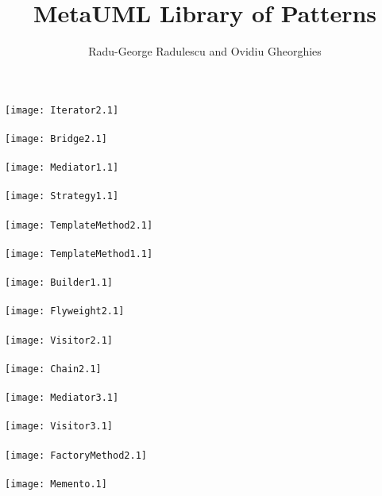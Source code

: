 \documentclass{article}
\title{MetaUML Library of Patterns}
\author{Radu-George Radulescu and Ovidiu Gheorghies}
\begin{document}
 \maketitle
\texttt{[image: Iterator2.1]} \\ \vspace{2cm} \\
\texttt{[image: Bridge2.1]} \\ \vspace{2cm} \\
\texttt{[image: Mediator1.1]} \\ \vspace{2cm} \\
\texttt{[image: Strategy1.1]} \\ \vspace{2cm} \\
\texttt{[image: TemplateMethod2.1]} \\ \vspace{2cm} \\
\texttt{[image: TemplateMethod1.1]} \\ \vspace{2cm} \\
\texttt{[image: Builder1.1]} \\ \vspace{2cm} \\
\texttt{[image: Flyweight2.1]} \\ \vspace{2cm} \\
\texttt{[image: Visitor2.1]} \\ \vspace{2cm} \\
\texttt{[image: Chain2.1]} \\ \vspace{2cm} \\
\texttt{[image: Mediator3.1]} \\ \vspace{2cm} \\
\texttt{[image: Visitor3.1]} \\ \vspace{2cm} \\
\texttt{[image: FactoryMethod2.1]} \\ \vspace{2cm} \\
\texttt{[image: Memento.1]} \\ \vspace{2cm} \\
\end{document}

